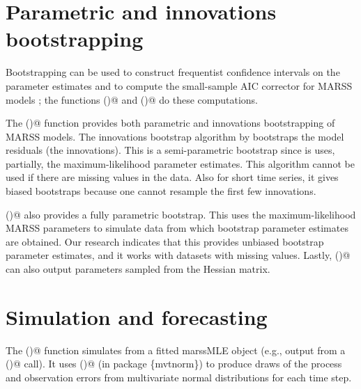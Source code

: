\section{Parametric and innovations bootstrapping}
Bootstrapping can be used to construct frequentist confidence intervals on the parameter estimates \citep{StofferWall1991} and to compute the small-sample AIC corrector for MARSS models \citep{CavanaughShumway1997}; the functions \verb@MARSSparamCIs()@ and \verb@MARSSaic()@ do these computations. 

The \verb@MARSSboot()@ function provides both parametric and innovations bootstrapping of MARSS models.  
The innovations bootstrap algorithm by \citet{StofferWall1991}  bootstraps the model residuals (the innovations).  This is a semi-parametric bootstrap since is uses, partially, the maximum-likelihood parameter estimates.  This algorithm cannot be used if there are missing values in the data.  Also for short time series, it gives biased bootstraps because one cannot resample the first few innovations.  

\verb@MARSSboot()@ also provides a fully parametric bootstrap.  This uses the maximum-likelihood MARSS parameters to simulate data from which bootstrap parameter estimates are obtained.  Our research \citep{HolmesWard2010} indicates that this provides unbiased bootstrap parameter estimates, and it works with datasets with missing values.  Lastly, \verb@MARSSboot()@ can also output parameters sampled from the Hessian matrix.  

\section{Simulation and forecasting}
The \verb@MARSSsimulate()@ function simulates from a fitted marssMLE object (e.g., output from a \verb@MARSS()@ call).  It uses \verb@rmvnorm()@ (in package \{mvtnorm\}) to produce draws of the process and observation errors from multivariate normal distributions for each time step.  

